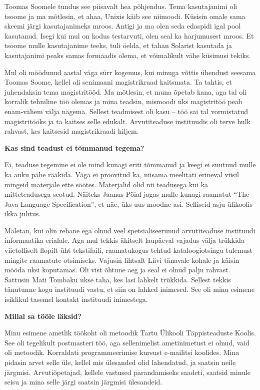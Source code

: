 Toomas Soomele tundus see piisavalt hea põhjendus.
Tema kasutajanimi oli tsoome ja ma mõtlesin, et ahaa,
Unixis käib see niimoodi. Küsisin omale sama skeemi järgi
kasutajanimeks mroos. Antigi ja ma olen seda edaspidi
igal pool kasutanud. Isegi kui mul on kodus testarvuti, olen seal ka
harjumusest mroos. Et tsoome mulle kasutajanime teeks, tuli öelda, et tahan
Solarist kasutada ja kasutajanimi peaks samas formaadis olema, et
võimalikult vähe küsimusi tekiks.

Mul oli möödunud aastal
väga sürr kogemus, kui minuga võttis ühendust seesama Toomas Soome, kellel
oli senimaani magistrikraad kaitsmata. Ta tahtis, et juhendaksin tema
magistritööd. Ma mõtlesin, et muna õpetab kana, aga tal
oli korralik tehniline töö olemas ja mina teadsin, mismoodi üks magistritöö
peab enam-vähem välja nägema. Sellest teadmisest oli kasu -- töö sai tal
vormistatud magistritööks ja ta kaitses selle edukalt. Arvutiteaduse instituudis oli terve hulk rahvast,
kes kaitsesid magistrikraadi hiljem.

\textbf{Kas sind teadust ei tõmmanud tegema?}

Ei, teaduse tegemine ei ole mind kunagi eriti tõmmanud ja keegi ei suutnud
mulle ka auku pähe rääkida. Väga ei proovitud ka, niisama meelitati
erineval viisil mingeid materjale ette söötes. Materjalid olid nii
teadusega kui ka mitteteadusega seotud. Näiteks Jaanus Pöial jagas mulle kunagi raamatut \enquote{The Java Language Specification},
et näe, üks uus moodne asi. Selliseid asju ülikoolis ikka juhtus.

Mäletan, kui olin rebane ega olnud veel spetsialiseerunud arvutiteaduse
instituudi informaatika erialale. Aga mul tekkis äkitselt laupäeval vajadus välja trükkida
viietolliselt flopilt üht tekstifaili, raamatukogus tehtud kataloogiotsingu tulemust mingite raamatute otsimiseks. Vajusin lihtsalt Liivi tänavale kohale ja
käisin mööda uksi koputamas. Oli vist õhtune aeg ja seal
ei olnud palju rahvast. Sattusin Mati Tombaku ukse
taha, kes lasi lahkelt trükkida. Sellest tekkis tänutunne kogu
instituudi vastu, et siin on lahked inimesed. See oli minu esimene
isiklikul tasemel kontakt instituudi inimestega.

\textbf{Millal sa tööle läksid?} 	

Minu esimene ametlik töökoht oli metoodik Tartu Ülikooli Täppisteaduste
Koolis. See oli tegelikult
postmasteri töö, aga sellenimelist ametinimetust ei olnud, vaid oli metoodik.
Korraldati programmeerimise kursust e-mailitsi koolides. Mina
pidasin arvet selle üle, kellel mis ülesanded olid lahendatud, ja saatsin neile
järgmisi. Arvutiõpetajad, kellele vastused parandamiseks saadeti,
saatsid minule seisu ja mina selle järgi saatsin järgmisi ülesandeid. 

